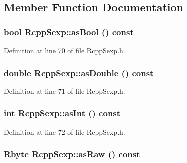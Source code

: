 \subsection{Member Function Documentation}
\hypertarget{classRcppSexp_ad4ee2b8e4024eded1a8468f627fdd9ca}{
\subsubsection[{asBool}]{\setlength{\rightskip}{0pt plus 5cm}bool RcppSexp::asBool () const}}
\label{classRcppSexp_ad4ee2b8e4024eded1a8468f627fdd9ca}


Definition at line 70 of file RcppSexp.h.\hypertarget{classRcppSexp_a418a55a88fe2161d2bce11dbe1d49153}{
\subsubsection[{asDouble}]{\setlength{\rightskip}{0pt plus 5cm}double RcppSexp::asDouble () const}}
\label{classRcppSexp_a418a55a88fe2161d2bce11dbe1d49153}


Definition at line 71 of file RcppSexp.h.\hypertarget{classRcppSexp_abf1d0f9b957e14e1ed3846eac93c7ccd}{
\subsubsection[{asInt}]{\setlength{\rightskip}{0pt plus 5cm}int RcppSexp::asInt () const}}
\label{classRcppSexp_abf1d0f9b957e14e1ed3846eac93c7ccd}


Definition at line 72 of file RcppSexp.h.\hypertarget{classRcppSexp_ad699e452afde5da0170a00b9536c3166}{
\subsubsection[{asRaw}]{\setlength{\rightskip}{0pt plus 5cm}Rbyte RcppSexp::asRaw () const}}
\label{classRcppSexp_ad699e452afde5da0170a00b9536c3166}


